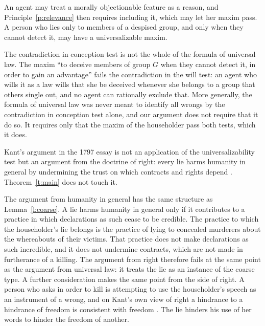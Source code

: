 \documentclass{situationist-preprint}
\begin{document}
\begin{objection}\label{o:conceal}
An agent may treat a morally objectionable feature as a reason, and Principle~\ref{p:relevance} then requires including it, which may let her maxim pass. A person who lies only to members of a despised group, and only when they cannot detect it, may have a universalizable maxim.
\end{objection}

\begin{reply}
The contradiction in conception test is not the whole of the formula of universal law. The maxim \enquote{to deceive members of group $G$ when they cannot detect it, in order to gain an advantage} fails the contradiction in the will test: an agent who wills it as a law wills that she be deceived whenever she belongs to a group that others single out, and no agent can rationally exclude that. More generally, the formula of universal law was never meant to identify all wrongs by the contradiction in conception test alone, and our argument does not require that it do so. It requires only that the maxim of the householder pass both tests, which it does.
\end{reply}

\begin{objection}\label{o:right}
Kant's argument in the 1797 essay is not an application of the universalizability test but an argument from the doctrine of right: every lie harms humanity in general by undermining the trust on which contracts and rights depend \citep{Kant1797}. Theorem~\ref{t:main} does not touch it.
\end{objection}

\begin{reply}
The argument from humanity in general has the same structure as Lemma~\ref{l:coarse}. A lie harms humanity in general only if it contributes to a practice in which declarations as such cease to be credible. The practice to which the householder's lie belongs is the practice of lying to concealed murderers about the whereabouts of their victims. That practice does not make declarations as such incredible, and it does not undermine contracts, which are not made in furtherance of a killing. The argument from right therefore fails at the same point as the argument from universal law: it treats the lie as an instance of the coarse type. A further consideration makes the same point from the side of right. A person who asks in order to kill is attempting to use the householder's speech as an instrument of a wrong, and on Kant's own view of right a hindrance to a hindrance of freedom is consistent with freedom \citep{Kant1797b}. The lie hinders his use of her words to hinder the freedom of another.
\end{reply}
\end{document}
